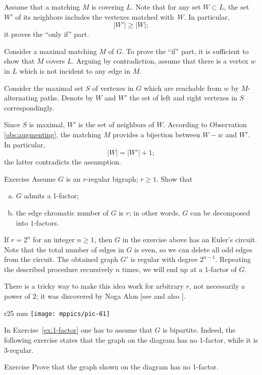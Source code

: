 Assume that a matching $M$ is covering $L$.
Note that for any set  $W\subset L$, the set $W'$ of its neighbors includes the vertexes matched with~$W$.
In particular,
\[|W'|\ge |W|;\]
it proves the ``only if'' part.

Consider a maximal matching $M$ of $G$.
To prove the ``if'' part, it is sufficient to show that $M$ covers $L$.
Arguing by contradiction, assume that there is a vertex $w$ in $L$ which is not incident to any edge in $M$.

Consider the maximal set $S$ of vertexes in $G$ which are reachable from $w$ by 
$M$-alternating paths.
Denote by $W$ and $W'$ the set of left and right vertexes in $S$ correspondingly.

Since $S$ is maximal, $W'$ is the set of neighbors of $W$. 
According to Observation \ref{obs:augmenting}, the matching $M$ provides a bijection between $W-w$ and $W'$.
In particular, 
\[|W|=|W'|+1;\] 
the latter contradicts the assumption.
\qeds

\begin{thm}{Exercise}\label{ex:1-factor}
Assume $G$ is an $r$-regular bigraph; $r\ge 1$.
Show that 
\begin{enumerate}[(a)]
\item $G$ admits a 1-factor;
\item the edge chromatic number of $G$ is $r$; in other words, $G$ can be decomposed into $1$-factors.
\end{enumerate}

\end{thm}

If $r=2^n$ for an integer $n\ge 1$, then $G$ in the exercise above has an Euler's circuit. 
Note that the total number of edges in $G$ is even, so we can delete all odd edges from the circuit.
The obtained graph $G'$ is regular with degree $2^{n-1}$.
Repeating the described procedure recursively $n$ times, 
we will end up at a 1-factor of $G$.

There is a tricky way to make this idea work for arbitrary $r$, not necessarily a power of $2$; 
it was discovered by Noga Alon [see  and also ]. 

\medskip

{

\begin{wrapfigure}{r}{25 mm}
\vskip-6mm
\centering
\texttt{[image: mppics/pic-61]}
\vskip-0mm
\end{wrapfigure}

In Exercise~\ref{ex:1-factor} one has to assume that $G$ is bipartite.
Indeed, the following exercise states that the graph on the diagram has no 1-factor,
while it is 3-regular.

\begin{thm}{Exercise}
Prove that the graph shown on the diagram has no 1-factor.
\end{thm}

}

